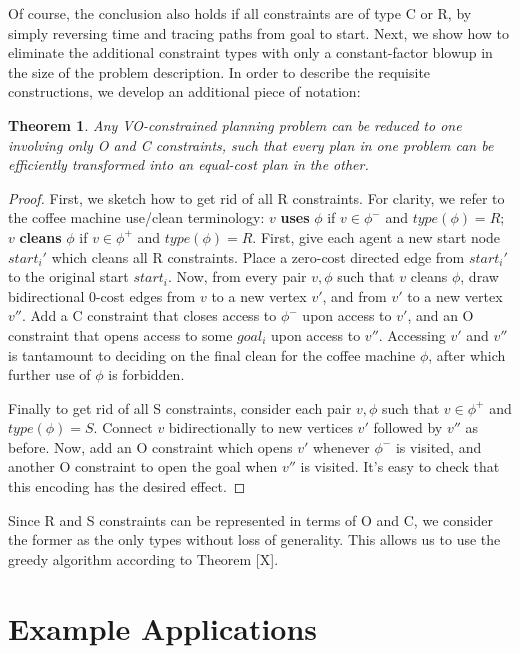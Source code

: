 \documentclass[letterpaper]{article}
\newtheorem{thm}{Theorem}
\begin{document}
Of course, the conclusion also holds if all constraints are of type C or R, by simply reversing time and tracing paths from goal to start. Next, we show how to eliminate the additional constraint types with only a constant-factor blowup in the size of the problem description. In order to describe the requisite constructions, we develop an additional piece of notation: 

\begin{thm}
Any VO-constrained planning problem can be reduced to one involving only O and C constraints, such that every plan in one problem can be efficiently transformed into an equal-cost plan in the other.
\end{thm}

\begin{proof}
First, we sketch how to get rid of all R constraints. For clarity, we refer to the coffee machine use/clean terminology: $v$ \textbf{uses} $\phi$ if $v\in\phi^-$ and $type(\phi) = R$; $v$ \textbf{cleans} $\phi$ if $v\in\phi^+$ and $type(\phi) = R$. First, give each agent a new start node $start_i'$ which cleans all R constraints. Place a zero-cost directed edge from $start_i'$ to the original start $start_i$. Now, from every pair $v,\phi$ such that $v$ cleans $\phi$, draw bidirectional 0-cost edges from $v$ to a new vertex $v'$, and from $v'$ to a new vertex $v''$. Add a C constraint that closes access to $\phi^-$ upon access to $v'$, and an O constraint that opens access to some $goal_i$ upon access to $v''$. Accessing $v'$ and $v''$ is tantamount to deciding on the final clean for the coffee machine $\phi$, after which further use of $\phi$ is forbidden.

Finally to get rid of all S constraints, consider each pair $v,\phi$ such that $v\in\phi^+$ and $type(\phi) = S$. Connect $v$ bidirectionally to new vertices $v'$ followed by $v''$ as before. Now, add an O constraint which opens $v'$ whenever $\phi^-$ is visited, and another O constraint to open the goal when $v''$ is visited. It's easy to check that this encoding has the desired effect.
\end{proof}

Since R and S constraints can be represented in terms of O and C, we consider the former as the only types without loss of generality. This allows us to use the greedy algorithm according to Theorem [X].

\section{Example Applications}
\end{document}
